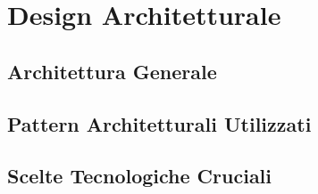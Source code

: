 \chapter{Design Architetturale}
    \section{Architettura Generale}
    \section{Pattern Architetturali Utilizzati}
    \section{Scelte Tecnologiche Cruciali}
